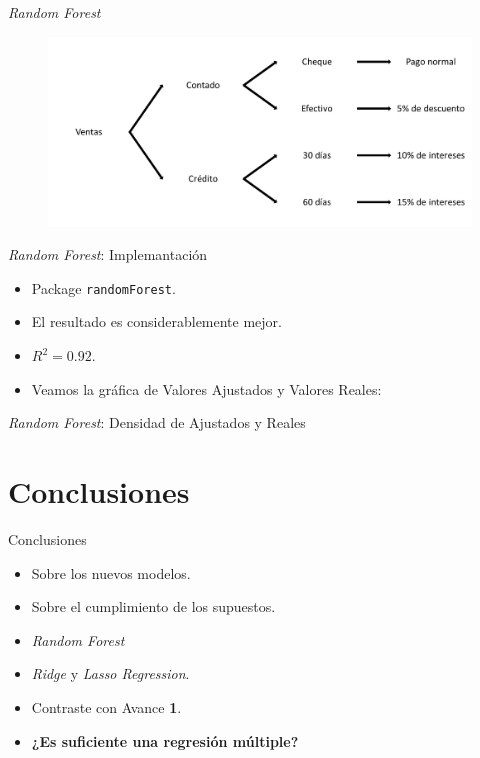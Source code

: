 \documentclass[11pt]{beamer}
\newcommand{\cod}[1]{\texttt{\frenchspacing#1}}
\begin{document}
\begin{frame}{\textit{Random Forest}}
	\begin{figure}
		\includegraphics[scale=0.4]{figures/arbol-de-decisiones.png}
	\end{figure}
\end{frame}

\begin{frame}{\textit{Random Forest}: Implemantación}
	\begin{itemize}
		\item Package \cod{randomForest}.
		\pause
		\item El resultado es considerablemente mejor.
		\pause
		\item $R^2=\mathbf{0.92}$.
		\pause
		\item Veamos la gráfica de Valores Ajustados y Valores Reales:
	\end{itemize}
\end{frame}

\begin{frame}{\textit{Random Forest}: Densidad de Ajustados y Reales}

	\end{frame}

\section{Conclusiones}

\begin{frame}{Conclusiones}
	\begin{itemize}
		\item Sobre los nuevos modelos.
		\pause
		\item Sobre el cumplimiento de los supuestos.
		\pause
		\item \textit{Random Forest}
		\pause
		\item \textit{Ridge} y \textit{Lasso Regression}.
		\pause
		\item Contraste con Avance \textbf{1}.
		\pause
		\item \textbf{¿Es suficiente una regresión múltiple?}
	\end{itemize}
\end{frame}
\end{document}
